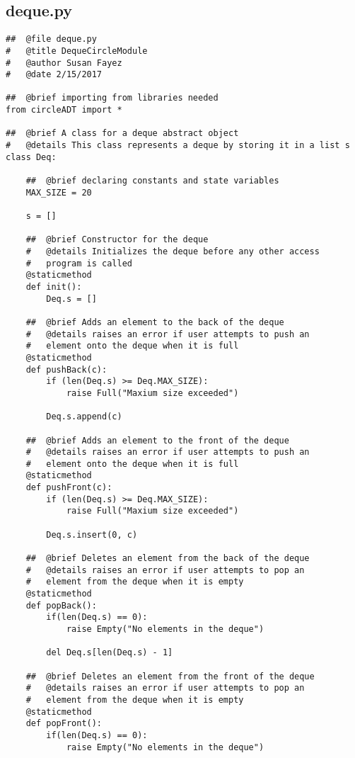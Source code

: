 \documentclass{article}
\begin{document}
\subsection{deque.py}
\begin{lstlisting}
##  @file deque.py
#   @title DequeCircleModule
#   @author Susan Fayez
#   @date 2/15/2017

##  @brief importing from libraries needed
from circleADT import *

##  @brief A class for a deque abstract object
#   @details This class represents a deque by storing it in a list s
class Deq:

    ##  @brief declaring constants and state variables
    MAX_SIZE = 20

    s = []

    ##  @brief Constructor for the deque 
    #   @details Initializes the deque before any other access 
    #   program is called 
    @staticmethod
    def init():
        Deq.s = []
        
    ##  @brief Adds an element to the back of the deque
    #   @details raises an error if user attempts to push an 
    #   element onto the deque when it is full
    @staticmethod
    def pushBack(c):
        if (len(Deq.s) >= Deq.MAX_SIZE):
            raise Full("Maxium size exceeded")
        
        Deq.s.append(c)
        
    ##  @brief Adds an element to the front of the deque
    #   @details raises an error if user attempts to push an 
    #   element onto the deque when it is full
    @staticmethod
    def pushFront(c):
        if (len(Deq.s) >= Deq.MAX_SIZE):
            raise Full("Maxium size exceeded")
        
        Deq.s.insert(0, c)
        
    ##  @brief Deletes an element from the back of the deque
    #   @details raises an error if user attempts to pop an 
    #   element from the deque when it is empty
    @staticmethod
    def popBack():
        if(len(Deq.s) == 0):
            raise Empty("No elements in the deque")
        
        del Deq.s[len(Deq.s) - 1]
        
    ##  @brief Deletes an element from the front of the deque
    #   @details raises an error if user attempts to pop an 
    #   element from the deque when it is empty
    @staticmethod
    def popFront():
        if(len(Deq.s) == 0):
            raise Empty("No elements in the deque")
        

\end{lstlisting}
\end{document}
